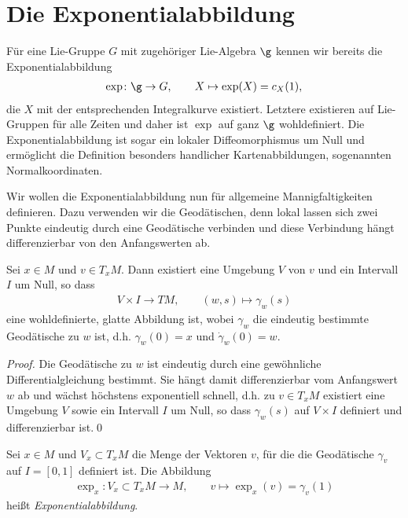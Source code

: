 \documentclass[%
	paper=a5,%
	fleqn,%
	DIV=18,%
	BCOR=0mm,
	fontsize=11pt,
	titlepage=false,%
	bibliography=totoc,
	DIV=18,%
	twoside=true,
	pdftitle=Riemannsche Geometrie,
	pdfauthor=Uwe Semmelmann,
	numbers=noendperiod]%
	{scrbook}
\begin{document}
\section{Die Exponentialabbildung}

Für eine Lie-Gruppe $G$ mit zugehöriger Lie-Algebra $\g$ kennen wir bereits die
Exponentialabbildung
\begin{align*}
\exp\colon \g \to G,\qquad X\mapsto \exp(X) = c_X(1),
\end{align*}
die $X$ mit der entsprechenden Integralkurve existiert. Letztere existieren auf Lie-Gruppen für
alle Zeiten und daher ist $\exp$ auf ganz $\g$ wohldefiniert. Die Exponentialabbildung ist
sogar ein lokaler Diffeomorphismus um Null und ermöglicht die Definition
besonders handlicher Kartenabbildungen, sogenannten Normalkoordinaten.

Wir wollen die Exponentialabbildung nun für allgemeine Mannigfaltigkeiten
definieren. Dazu verwenden wir die Geodätischen, denn lokal lassen sich zwei Punkte
eindeutig durch eine Geodätische verbinden und diese Verbindung hängt
differenzierbar von den Anfangswerten ab.

\begin{lem}
Sei $x\in M$ und $v\in T_xM$. Dann existiert eine Umgebung $V$ von $v$ und ein
Intervall $I$ um Null, so dass
\begin{align*}
 V\times I\to TM,\qquad (w,s)\mapsto \gamma_w(s)
\end{align*}
eine wohldefinierte, glatte Abbildung ist, wobei $\gamma_w$ die eindeutig
bestimmte Geodätische zu $w$ ist, d.h. $\gamma_w(0) = x$ und $\dot{\gamma}_w(0)
= w$.\fish
\end{lem}

\begin{proof}
Die Geodätische zu $w$ ist eindeutig durch eine gewöhnliche
Differentialgleichung bestimmt. Sie hängt damit differenzierbar
vom Anfangswert $w$ ab und wächst höchstens exponentiell schnell, d.h.
zu $v\in T_xM$ existiert eine Umgebung $V$ sowie ein Intervall $I$ um Null, so
dass $\gamma_w(s)$ auf $V\times I$ definiert und differenzierbar ist.\qed
\end{proof}

\begin{defn}
Sei $x\in M$ und $V_x\subset T_xM$ die Menge der Vektoren $v$, für die die
Geodätische $\gamma_v$ auf $I=[0,1]$ definiert ist. Die Abbildung
\begin{align*}
\exp_x : V_x\subset T_xM\to M,\qquad v\mapsto \exp_x(v) = \gamma_v(1)
\end{align*}
heißt \emph{Exponentialabbildung}.\fish
\end{defn}
\end{document}
